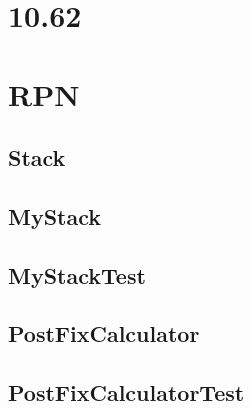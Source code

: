 \documentclass{article}
\begin{document}
\section*{10.62}



\section*{RPN}

	\subsection*{Stack}
	
	
	
	\subsection {MyStack}

	

	\subsection {MyStackTest}

	

	\subsection*{PostFixCalculator}
	
	

	\subsection*{PostFixCalculatorTest}	
	
\end{document}

